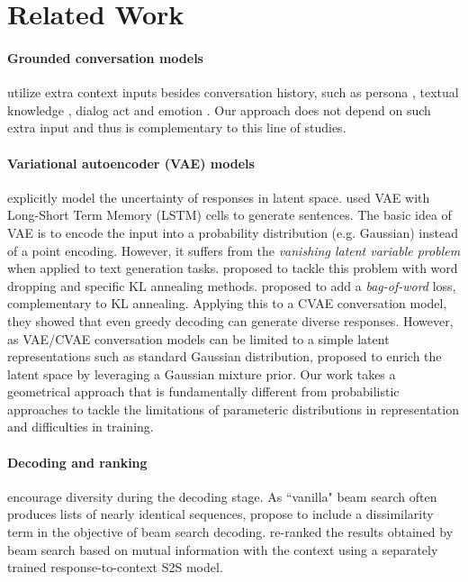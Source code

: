 \documentclass[11pt,a4paper]{article}
\begin{document}
 
\section{Related Work}


\paragraph{Grounded conversation models} utilize extra context inputs besides conversation history, such as persona \cite{li2016persona}, textual knowledge \cite{ghazvininejad2017knowledge, dstc7track2}, dialog act \cite{zhao2017cvae} and emotion \cite{huber2018emotional}. Our approach does not depend on such extra input and thus is complementary to this line of studies.

\paragraph{Variational autoencoder (VAE) models} explicitly model the uncertainty of responses in latent space. \citet{bowman2016vae} used VAE with Long-Short Term Memory (LSTM) cells to generate sentences. The basic idea of VAE is to encode the input  into a probability distribution (e.g. Gaussian)  instead of a point encoding. 
However, it suffers from the \textit{vanishing latent variable problem} \cite{bowman2016vae, zhao2017cvae} when applied to text generation tasks. \citet{bowman2016vae, fu2019cyclical} proposed to tackle this problem with word dropping and specific KL annealing methods. 
\citet{zhao2017cvae} proposed to add a \textit{bag-of-word} loss, complementary to KL annealing. Applying this to a CVAE conversation model, they showed that even greedy decoding can generate diverse responses. However, as VAE/CVAE conversation models can be limited to a simple latent representations such as standard Gaussian distribution, \citet{gu2018dialogwae} proposed to enrich the latent space by leveraging a Gaussian mixture prior. Our work takes a geometrical approach that is fundamentally different from probabilistic approaches to tackle the limitations of parameteric distributions in representation and difficulties in training.


\paragraph{Decoding and ranking} encourage diversity during the decoding stage. As ``vanilla" beam search often produces lists of nearly identical sequences, \citet{vijayakumar2016dbs} propose to include a dissimilarity term in the objective of beam search decoding. \citet{li2016mmi} re-ranked the results obtained by beam search based on mutual information with the context using a separately trained response-to-context S2S model.
\end{document}
